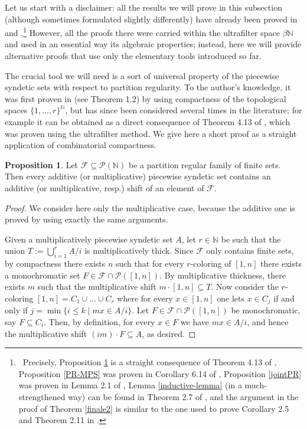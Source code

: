 \documentclass[a4paper,oneside]{article}
\newcommand{\N}{\mathbb{N}}
\newcommand{\PP}{\mathcal{P}}
\newcommand{\F}{\mathcal{F}}
\theoremstyle{definition}
\newtheorem{proposition}[theorem]{Proposition}
\theoremstyle{named}
\begin{document}
Let us start with a disclaimer: all the results we will prove in this subsection 
(although sometimes formulated slightly differently) have already been 
proved in \cite{lb} and \cite{dlb}.\footnote
{~Precisely, Proposition \ref{shiftPS} is a straight consequence of Theorem 4.13 of \cite{lb}, 
Proposition \ref{PR-MPS} was proven in Corollary 6.14 of \cite{lb}, 
Proposition \ref{jointPR} was proven in Lemma 2.1 of \cite{dlb}, 
Lemma \ref{inductive-lemma} (in a much-strengthened way) 
can be found in Theorem 2.7 of \cite{dlb}, and the argument in the proof of
Theorem \ref{finale2} is similar to the one used to prove 
Corollary 2.5 and Theorem 2.11 in \cite{dlb}.}
However, all the proofs there were carried within the ultrafilter space $\beta\N$
and used in an essential way its algebraic properties; instead,
here we will provide alternative proofs that use only the elementary tools
introduced so far.

The crucial tool we will need is a sort of universal property of the piecewise syndetic
sets with respect to partition regularity.
To the author's knowledge, it was first proven in \cite{mc} (see Theorem 1.2)
by using compactness of the topological spaces $\{1,\ldots,r\}^\N$, 
but has since been considered several times in the literature; 
for example it can be obtained as a direct consequence of Theorem 4.13 of \cite{lb}, 
which was proven using the ultrafilter method.
We give here a short proof as a straight application of combinatorial compactness.

\begin{proposition}\label{shiftPS}
Let $\F\subseteq\PP(\N) $ be a partition regular family of finite sets.
Then every additive (or multiplicative) piecewise syndetic set contains an 
additive (or multiplicative, resp.) shift of an element of $\F$.
\end{proposition}

\begin{proof} 
We consider here only the multiplicative case, 
because the additive one is proved by using exactly the same arguments.

Given a multiplicatively piecewise syndetic set $A$,
let $r\in\N$ be such that the union $T:=\bigcup_{i=1}^r A/i$ is multiplicatively thick. 
Since $\F$ only contains finite sets, by compactness 
there exists $n$ such that for every $r$-coloring of $[1,n]$ 
there exists a monochromatic set $F\in\F\cap\PP([1,n])$. 
By multiplicative thickness, 
there exists $m$ such that the multiplicative shift $m\cdot [1,n]\subseteq T$.
Now consider the $r$-coloring $[1,n]=C_1\cup\ldots\cup C_r$
where for every $x\in [1,n]$ one lets $x\in C_j$ if and only if $j=\min\{i\leq k\mid m x\in A/i\}$. 
Let $F\in\F\cap \PP([1,n])$ be monochromatic, say $F\subseteq C_i$.
Then, by definition, for every $x\in F$ we have $mx\in A/i$, 
and hence the multiplicative shift $(im)\cdot F\subseteq A$, as desired.
\end{proof}
\end{document}
